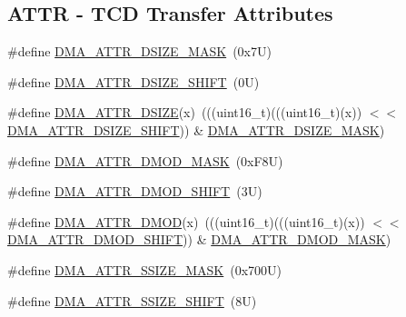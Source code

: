 \subsection*{A\+T\+TR -\/ T\+CD Transfer Attributes}
\begin{DoxyCompactItemize}
\item 
\#define \mbox{\hyperlink{group___d_m_a___register___masks_ga2093ce5434ffef34988c7e74999edbee}{D\+M\+A\+\_\+\+A\+T\+T\+R\+\_\+\+D\+S\+I\+Z\+E\+\_\+\+M\+A\+SK}}~(0x7\+U)
\item 
\#define \mbox{\hyperlink{group___d_m_a___register___masks_ga24d7778d89bba4e048649cfa85bbc2d3}{D\+M\+A\+\_\+\+A\+T\+T\+R\+\_\+\+D\+S\+I\+Z\+E\+\_\+\+S\+H\+I\+FT}}~(0\+U)
\item 
\#define \mbox{\hyperlink{group___d_m_a___register___masks_ga6f2bffdadee81034ea85759111dfc711}{D\+M\+A\+\_\+\+A\+T\+T\+R\+\_\+\+D\+S\+I\+ZE}}(x)~(((uint16\+\_\+t)(((uint16\+\_\+t)(x)) $<$$<$ \mbox{\hyperlink{group___d_m_a___register___masks_ga24d7778d89bba4e048649cfa85bbc2d3}{D\+M\+A\+\_\+\+A\+T\+T\+R\+\_\+\+D\+S\+I\+Z\+E\+\_\+\+S\+H\+I\+FT}})) \& \mbox{\hyperlink{group___d_m_a___register___masks_ga2093ce5434ffef34988c7e74999edbee}{D\+M\+A\+\_\+\+A\+T\+T\+R\+\_\+\+D\+S\+I\+Z\+E\+\_\+\+M\+A\+SK}})
\item 
\#define \mbox{\hyperlink{group___d_m_a___register___masks_gaaa09f9ea822cc0cfe20270611cf522cc}{D\+M\+A\+\_\+\+A\+T\+T\+R\+\_\+\+D\+M\+O\+D\+\_\+\+M\+A\+SK}}~(0x\+F8\+U)
\item 
\#define \mbox{\hyperlink{group___d_m_a___register___masks_gab9f08d507f579493d605780d854404d6}{D\+M\+A\+\_\+\+A\+T\+T\+R\+\_\+\+D\+M\+O\+D\+\_\+\+S\+H\+I\+FT}}~(3\+U)
\item 
\#define \mbox{\hyperlink{group___d_m_a___register___masks_ga817a104659b44c38da980ccf0ca4f594}{D\+M\+A\+\_\+\+A\+T\+T\+R\+\_\+\+D\+M\+OD}}(x)~(((uint16\+\_\+t)(((uint16\+\_\+t)(x)) $<$$<$ \mbox{\hyperlink{group___d_m_a___register___masks_gab9f08d507f579493d605780d854404d6}{D\+M\+A\+\_\+\+A\+T\+T\+R\+\_\+\+D\+M\+O\+D\+\_\+\+S\+H\+I\+FT}})) \& \mbox{\hyperlink{group___d_m_a___register___masks_gaaa09f9ea822cc0cfe20270611cf522cc}{D\+M\+A\+\_\+\+A\+T\+T\+R\+\_\+\+D\+M\+O\+D\+\_\+\+M\+A\+SK}})
\item 
\#define \mbox{\hyperlink{group___d_m_a___register___masks_ga30f2f09fb581b8c9619414125cf3045b}{D\+M\+A\+\_\+\+A\+T\+T\+R\+\_\+\+S\+S\+I\+Z\+E\+\_\+\+M\+A\+SK}}~(0x700\+U)
\item 
\#define \mbox{\hyperlink{group___d_m_a___register___masks_ga815c285ac74667a99f2a7ce5e686641b}{D\+M\+A\+\_\+\+A\+T\+T\+R\+\_\+\+S\+S\+I\+Z\+E\+\_\+\+S\+H\+I\+FT}}~(8\+U)

\end{DoxyCompactItemize}
